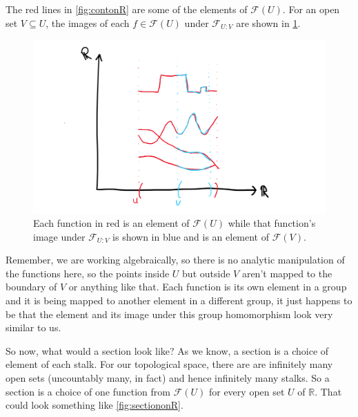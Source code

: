 \documentclass{tufte-handout}
\newcommand{\F}{\mathcal{F}}
\newcommand{\R}{\mathbb{R}}
\begin{document}
The red lines in \cref{fig:contonR} are some of the elements of $\F(U)$. For an open set $V \subseteq U$, the images of each $f \in \F(U)$ under $\F_{U:V}$ are shown in \cref{fig:contonR_res}.

\begin{figure}[h!]
    \centering
    \includegraphics{contonR_res.png}
    \caption{Each function in red is an element of $\F(U)$ while that function's image under $\F_{U:V}$ is shown in blue and is an element of $\F(V)$.}
    \label{fig:contonR_res}
\end{figure}

Remember, we are working algebraically, so there is no analytic manipulation of the functions here, so the points inside $U$ but outside $V$ aren't mapped to the boundary of $V$ or anything like that. Each function is its own element in a group and it is being mapped to another element in a different group, it just happens to be that the element and its image under this group homomorphism look very similar to us. 


So now, what would a section look like? As we know, a section is a choice of element of each stalk. For our topological space, there are are infinitely many open sets (uncountably many, in fact) and hence infinitely many stalks. So a section is a choice of one function from $\F(U)$ for every open set $U$ of $\R$. That could look something like \cref{fig:sectiononR}.
\end{document}
